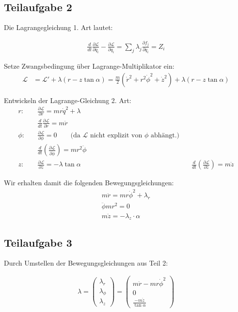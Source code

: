 \documentclass[a4paper,german,12pt,smallheadings]{scrartcl}
\begin{document}
\subsection*{Teilaufgabe 2}
Die Lagrangegleichung 1. Art lautet:

\begin{align*}
  \frac{d}{dt} \frac{\partial \mathcal{L}}{\partial \dot{q_i}} - \frac{\partial \mathcal{L}}{\partial q_i} = \sum_j \lambda_j \frac{\partial f_j}{\partial q_i} = Z_i
\end{align*}

Setze Zwangsbedingung über Lagrange-Multiplikator ein:
\begin{align*}
\mathcal{L}&=\mathcal{L'} + \lambda(r-z \tan \alpha) = \frac{m}{2}(\dot{r}^2+r^2\dot{\phi}^2+\dot{z}^2) + \lambda(r-z \tan \alpha) 
\end{align*}

Entwickeln der Lagrange-Gleichung 2. Art:
\begin{align*}
r: & \quad \frac{\partial \mathcal{L}}{\partial r}=mr\dot{q}^2 + \lambda\\
& \quad \frac{d}{dt}\frac{\partial \mathcal{L}}{\partial \dot{r}}=m\ddot{r} \\
\phi: & \quad \frac{\partial \mathcal{L}}{\partial \phi} = 0 \qquad \text{(da $\mathcal{L}$ nicht explizit von $\phi$ abhängt.)}\\
& \quad \frac{d}{dt}\left(\frac{\partial \mathcal{L}}{\partial \dot{\phi}}\right)=mr^2\ddot{\phi} \\
z: & \quad \frac{\partial \mathcal{L}}{\partial z} = -\lambda \tan \alpha
& \quad \frac{d}{dt}\left(\frac{\partial \mathcal{L}}{\partial \dot{z}}\right)= m\ddot{z}
\end{align*}

Wir erhalten damit die folgenden Bewegungsgleichungen:
\begin{align*}
m\ddot{r} = mr\dot{\phi}^2 + \lambda_r \\
\ddot{\phi}mr^2 = 0 \\
m\ddot{z} = -\lambda_z \cdot \alpha
\end{align*}

\subsection*{Teilaufgabe 3}

Durch Umstellen der Bewegungsgleichungen aus Teil 2:

\begin{align*}
  \lambda = \begin{pmatrix} \lambda_r \\ \lambda_{\phi} \\ \lambda_z \end{pmatrix} = \begin{pmatrix} m\ddot{r} - mr\dot{\phi}^2 \\ 0 \\ \frac{-m\ddot{z}}{\tan \alpha} \end{pmatrix}
\end{align*}
\end{document}
